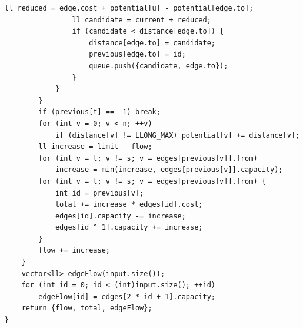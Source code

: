 \begin{lstlisting}[name=advanced_graph_min_cost_flow]
                ll reduced = edge.cost + potential[u] - potential[edge.to];
                ll candidate = current + reduced;
                if (candidate < distance[edge.to]) {
                    distance[edge.to] = candidate;
                    previous[edge.to] = id;
                    queue.push({candidate, edge.to});
                }
            }
        }
        if (previous[t] == -1) break;
        for (int v = 0; v < n; ++v)
            if (distance[v] != LLONG_MAX) potential[v] += distance[v];
        ll increase = limit - flow;
        for (int v = t; v != s; v = edges[previous[v]].from)
            increase = min(increase, edges[previous[v]].capacity);
        for (int v = t; v != s; v = edges[previous[v]].from) {
            int id = previous[v];
            total += increase * edges[id].cost;
            edges[id].capacity -= increase;
            edges[id ^ 1].capacity += increase;
        }
        flow += increase;
    }
    vector<ll> edgeFlow(input.size());
    for (int id = 0; id < (int)input.size(); ++id)
        edgeFlow[id] = edges[2 * id + 1].capacity;
    return {flow, total, edgeFlow};
}
\end{lstlisting}
%


